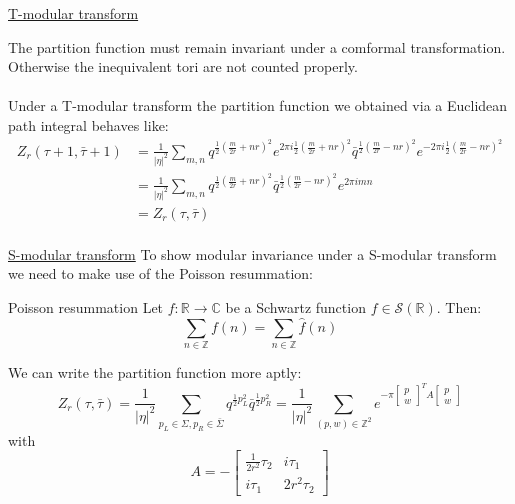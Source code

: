 \documentclass[11pt,aspectratio=169]{beamer}
\begin{document}
\begin{frame}{\underline{T-modular transform}}

	The partition function must remain invariant under a comformal transformation. Otherwise the inequivalent tori are not counted properly. 
	\\~\\
	Under a T-modular transform the partition function we obtained via a Euclidean path integral behaves like:
	\begin{align*}
		Z_r (\tau + 1, \bar{\tau} + 1) &= \frac{1}{|\eta|^2} \sum_{m, n} q^{\frac{1}{2}(\frac{m}{2r} + nr)^2}e^{2\pi i \frac{1}{2}(\frac{m}{2r} + nr)^2}
		\bar{q}^{\frac{1}{2}(\frac{m}{2r} - nr)^2}e^{-2\pi i \frac{1}{2}(\frac{m}{2r} - nr)^2} \\
		&= \frac{1}{|\eta|^2} \sum_{m, n} q^{\frac{1}{2}(\frac{m}{2r} + nr)^2}\bar{q}^{\frac{1}{2}(\frac{m}{2r} - nr)^2}e^{2 \pi i mn} \\
		&= Z_r (\tau, \bar{\tau}) \\
	\end{align*}


	
\end{frame}

\begin{frame}{\underline{S-modular transform}}
	To show modular invariance under a S-modular transform we need to make use of the Poisson resummation:
	\begin{block}{Poisson resummation}
		Let $f: \mathbb{R} \rightarrow \mathbb{C}$ be a Schwartz function $f \in \mathcal{S}(\mathbb{R})$.
		Then:
		\begin{equation}
			\sum_{n\in\mathbb{Z}} f(n) = \sum_{n\in\mathbb{Z}} \hat{f}(n)
		\end{equation}
	\end{block}
	We can write the partition function more aptly:
	\begin{equation}
		Z_r (\tau, \bar{\tau}) = \frac{1}{|\eta|^2} \sum_{p_L\in\Sigma, p_R\in\bar{\Sigma}} q^{\frac{1}{2}p_L^2}\bar{q}^{\frac{1}{2}p_R^2} = \frac{1}{|\eta|^2}\sum_{(p, w)\in\mathbb{Z}^2}e^{-\pi\begin{bmatrix} p \\ w \end{bmatrix}^T A \begin{bmatrix} p \\ w \end{bmatrix}}
	\end{equation}
	with 
	\begin{equation}
		A = -\begin{bmatrix} \frac{1}{2r^2}\tau_2 & i \tau_1 \\ i \tau_1 & 2r^2 \tau_2 \end{bmatrix}
	\end{equation}
\end{frame}
\end{document}

